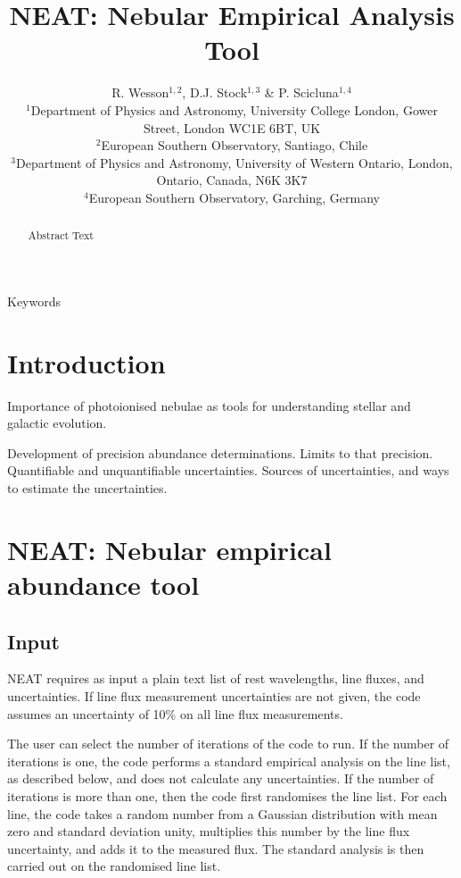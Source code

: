 \documentclass[useAMS,usenatbib]{mn2e}
\title[NEAT]{NEAT: Nebular Empirical Analysis Tool} %
\author[R. Wesson et al.]{R. Wesson$^{1,2}$, D.J. Stock$^{1,3}$ \& P. Scicluna$^{1,4}$\\
$^1$Department of Physics and Astronomy, University College London, Gower Street, London WC1E 6BT, UK\\
$^2$European Southern Observatory, Santiago, Chile \\ %
$^3$Department of Physics and Astronomy, University of Western Ontario, London, Ontario, Canada, N6K 3K7\\
$^4$European Southern Observatory, Garching, Germany\\ %
}
\begin{document}
\date{}

\pagerange{\pageref{firstpage}--\pageref{lastpage}} 

\maketitle

\label{firstpage}

\begin{abstract}
Abstract Text
\end{abstract}

\begin{keywords}
Keywords
\end{keywords}

\section{Introduction}

Importance of photoionised nebulae as tools for understanding stellar and galactic evolution.

Development of precision abundance determinations.  Limits to that precision.  Quantifiable and unquantifiable uncertainties.  Sources of uncertainties, and ways to estimate the uncertainties.

\section{NEAT: Nebular empirical abundance tool}

\subsection{Input}

NEAT requires as input a plain text list of rest wavelengths, line fluxes, and uncertainties.  If line flux measurement uncertainties are not given, the code assumes an uncertainty of 10\% on all line flux measurements.

The user can select the number of iterations of the code to run.  If the number of iterations is one, the code performs a standard empirical analysis on the line list, as described below, and does not calculate any uncertainties.  If the number of iterations is more than one, then the code first randomises the line list.  For each line, the code takes a random number from a Gaussian distribution with mean zero and standard deviation unity, multiplies this number by the line flux uncertainty, and adds it to the measured flux.  The standard analysis is then carried out on the randomised line list.
\end{document}
